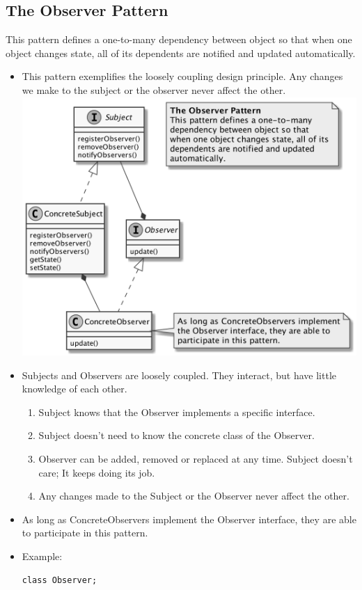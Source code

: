 \documentclass[11pt]{article}
\begin{document}
    \subsection{The Observer Pattern}
    This pattern defines a one-to-many dependency between object so that when one object changes state, all of its
    dependents are notified and updated automatically.
    \begin{itemize}
        \item This pattern exemplifies the loosely coupling design principle. Any changes we make to the subject or the observer
        never affect the other.\\
        \includegraphics[scale=0.15]{observer/1__loose_coupling}
        \item Subjects and Observers are loosely coupled. They interact, but have little knowledge of each other.
        \begin{enumerate}
            \item Subject knows that the Observer implements a specific interface.
            \item Subject doesn't need to know the concrete class of the Observer.
            \item Observer can be added, removed or replaced at any time. Subject doesn't care; It keeps doing its job.
            \item Any changes made to the Subject or the Observer never affect the other.
        \end{enumerate}
        \item As long as ConcreteObservers implement the Observer interface, they are able to participate in this pattern.
        \item Example:
        \begin{multicols}{2}
            \begin{lstlisting}
class Observer;


\end{lstlisting}
\end{multicols}
\end{itemize}
\end{document}
